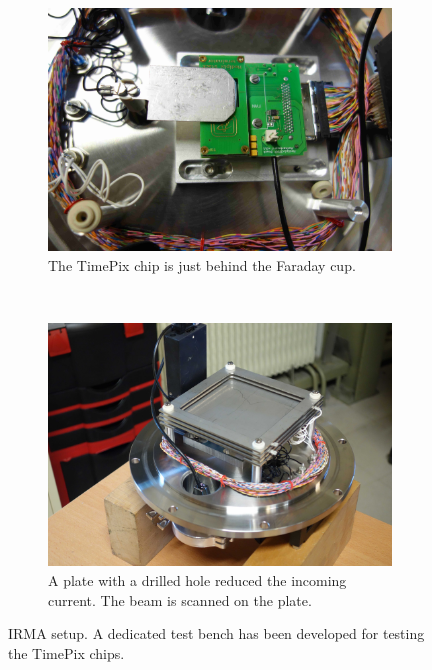 \begin{figure}[!ht]
	\begin{subfigure}[t]{0.5\textwidth}
		\includegraphics[width=\textwidth]{04_IPHI_Test/figures/fig000_IRMA_setup01}
		\caption{The TimePix chip is just behind the Faraday cup.}
		\label{}
	\end{subfigure}
	~
	\begin{subfigure}[t]{0.5\textwidth}
		\includegraphics[width=\textwidth]{04_IPHI_Test/figures/fig000_IRMA_setup02}
		\caption{A plate with a drilled hole reduced the incoming current. The beam is scanned on the plate.}
		\label{}
	\end{subfigure}
	\caption[IRMA setup]{IRMA setup. A dedicated test bench has been developed for testing the TimePix chips.}
	\label{chap4:IRMA_setup}
\end{figure}
